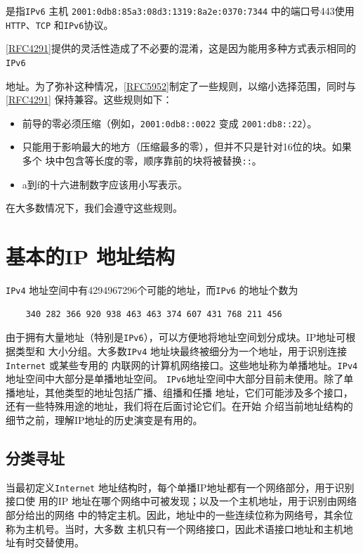 是指\verb|IPv6| 主机 \verb|2001:0db8:85a3:08d3:1319:8a2e:0370:7344| 中的端口号443使用\verb|HTTP|、\verb|TCP|
和\verb|IPv6|协议。

\href{https://www.rfc-editor.org/rfc/rfc4291}{[RFC4291]}提供的灵活性造成了不必要的混淆，这是因为能用多种方式表示相同的\verb|IPv6|

地址。为了弥补这种情况，\href{https://www.rfc-editor.org/rfc/rfc5952}{[RFC5952]}制定了一些规则，以缩小选择范围，同时与\href{https://www.rfc-editor.org/rfc/rfc4291}{[RFC4291]}
保持兼容。这些规则如下：

\begin{itemize}
    \item 前导的零必须压缩（例如，\verb|2001:0db8::0022| 变成 \verb|2001:db8::22|）。
    \item 只能用于影响最大的地方（压缩最多的零），但并不只是针对16位的块。如果多个
    块中包含等长度的零，顺序靠前的块将被替换\verb|::|。
    \item a到f的十六进制数字应该用小写表示。
\end{itemize}

在大多数情况下，我们会遵守这些规则。

\section{基本的IP 地址结构}
\verb|IPv4| 地址空间中有4294967296个可能的地址，而\verb|IPv6| 的地址个数为

\begin{verbatim}
    340 282 366 920 938 463 463 374 607 431 768 211 456
\end{verbatim}

由于拥有大量地址（特别是\verb|IPv6|），可以方便地将地址空间划分成块。IP地址可根据类型和
大小分组。大多数\verb|IPv4| 地址块最终被细分为一个地址，用于识别连接 \verb|Internet| 或某些专用的
内联网的计算机网络接口。这些地址称为单播地址。\verb|IPv4|地址空间中大部分是单播地址空间。
\verb|IPv6|地址空间中大部分目前未使用。除了单播地址，其他类型的地址包括广播、组播和任播
地址，它们可能涉及多个接口，还有一些特殊用途的地址，我们将在后面讨论它们。在开始
介绍当前地址结构的细节之前，理解IP地址的历史演变是有用的。

\subsection{分类寻址}
当最初定义\verb|Internet| 地址结构时，每个单播IP地址都有一个网络部分，用于识别接口使
用的IP 地址在哪个网络中可被发现；以及一个主机地址，用于识别由网络部分给出的网络
中的特定主机。因此，地址中的一些连续位称为网络号，其余位称为主机号。当时，大多数
主机只有一个网络接口，因此术语接口地址和主机地址有时交替使用。

